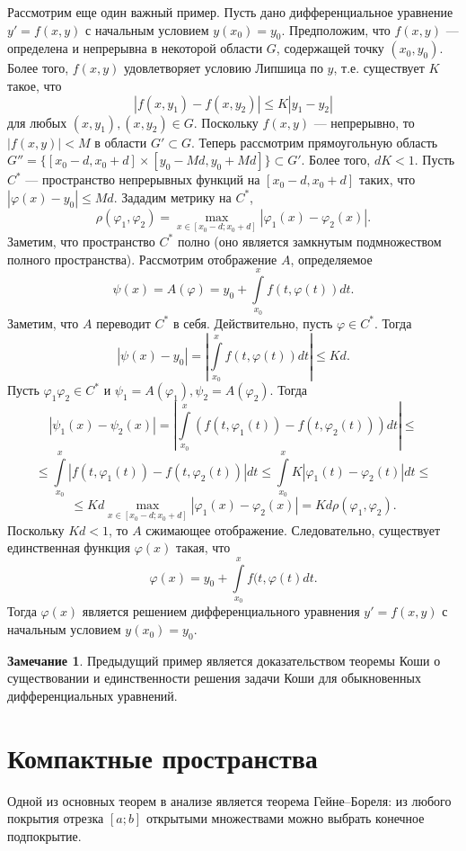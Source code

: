 \documentclass[12pt, titlepage, oneside]{amsbook}
\theoremstyle{definition}
\newtheorem{remark}[theorem]{Замечание}
\theoremstyle{remark}
\begin{document}
Рассмотрим еще один важный пример. Пусть дано дифференциальное уравнение $y'=f(x,y)$ с начальным условием $y(x_0)=y_0$. Предположим, что $f(x,y)$ --- определена и непрерывна в некоторой области $G$, содержащей точку $(x_0,y_0)$. Более того, $f(x,y)$ удовлетворяет условию Липшица по $y$, т.е. существует $K$ такое, что $$|f(x,y_1)-f(x,y_2)|\leq K|y_1-y_2|$$ для любых $(x,y_1), (x,y_2)\in G$. Поскольку $f(x,y)$ --- непрерывно, то $|f(x,y)|<M$ в области $G'\subset G$. Теперь рассмотрим прямоугольную область $G''=\{[x_0-d,x_0+d]\times[y_0-Md,y_0+Md]\}\subset G'$. Более того, $dK<1$. Пусть $C^*$ --- пространство непрерывных функций на $[x_0-d,x_0+d]$ таких, что $|\varphi(x)-y_0|\leq Md$. Зададим метрику на $C^*$, $$\rho(\varphi_1,\varphi_2)=\max\limits_{x\in[x_0-d;x_0+d]}|\varphi_1(x)-\varphi_2(x)|.$$ Заметим, что пространство $C^*$ полно (оно является замкнутым подмножеством полного пространства).
Рассмотрим отображение $A$, определяемое $$\psi(x)=A(\varphi)=y_0+\int\limits_{x_0}^x f(t,\varphi(t))dt.$$ Заметим, что $A$ переводит $C^*$ в себя. Действительно, пусть $\varphi\in C^*$. Тогда $$|\psi(x)-y_0|=\left|\int\limits_{x_0}^x f(t,\varphi(t))dt\right|\leq K d.$$ Пусть $\varphi_1 \varphi_2\in C^*$ и $\psi_1=A(\varphi_1), \psi_2=A(\varphi_2)$. Тогда $$|\psi_1(x)-\psi_2(x)|=\left|\int\limits_{x_0}^x (f(t,\varphi_1(t))-f(t,\varphi_2(t)))dt\right|\leq$$ $$\leq\int\limits_{x_0}^x |f(t,\varphi_1(t))-f(t,\varphi_2(t))|dt\leq\int\limits_{x_0}^x K|\varphi_1(t)-\varphi_2(t)|dt\leq$$ $$\leq Kd\max\limits_{x\in[x_0-d;x_0+d]}|\varphi_1(x)-\varphi_2(x)|=Kd\rho(\varphi_1,\varphi_2).$$ Поскольку $Kd<1$, то $A$ сжимающее отображение. Следовательно, существует единственная функция $\varphi(x)$ такая, что $$\varphi(x)=y_0+\int\limits_{x_0}^x f(t,\varphi(t)dt.$$ Тогда $\varphi(x)$ является решением дифференциального уравнения $y'=f(x,y)$ с начальным условием $y(x_0)=y_0$.

\begin{remark}
Предыдущий пример является доказательством теоремы Коши о существовании и единственности решения задачи Коши для обыкновенных дифференциальных уравнений.
\end{remark}

\section{Компактные пространства}

Одной из основных теорем в анализе является теорема Гейне--Бореля: из любого покрытия отрезка $[a;b]$ открытыми множествами можно выбрать конечное подпокрытие.
\end{document}
